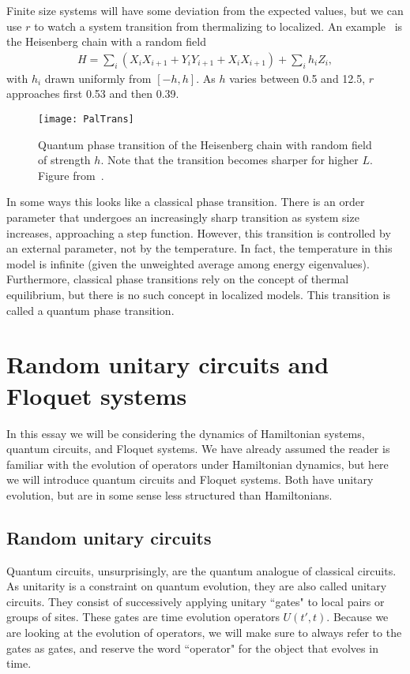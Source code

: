 \documentclass[a4paper,11pt]{article}
\begin{document}
Finite size systems will have some deviation from the expected values, but we can use $r$ to watch a system transition from thermalizing to localized. An example~\cite{PalHuse} is the Heisenberg chain with a random field
\begin{align}
H = \sum_i\left(X_iX_{i+1} + Y_iY_{i+1} + X_iX_{i+1}\right)+\sum_i h_iZ_i,
\end{align}
with $h_i$ drawn uniformly from $[-h,h]$. As $h$ varies between 0.5 and 12.5, $r$ approaches first 0.53 and then 0.39. 
\begin{figure}
	\centering
	\texttt{[image: PalTrans]}
	\caption{Quantum phase transition of the Heisenberg chain with random field of strength $h$. Note that the transition becomes sharper for higher $L$. Figure from~\cite{PalHuse}.}
	\label{fig:PalTrans}
\end{figure}
In some ways this looks like a classical phase transition. There is an order parameter that undergoes an increasingly sharp transition as system size increases, approaching a step function. However, this transition is controlled by an external parameter, not by the temperature. In fact, the temperature in this model is infinite (given the unweighted average among energy eigenvalues). Furthermore, classical phase transitions rely on the concept of thermal equilibrium, but there is no such concept in localized models. This transition is called a quantum phase transition.


\section{Random unitary circuits and Floquet systems} \label{sec:circuits}

In this essay we will be considering the dynamics of Hamiltonian systems, quantum circuits, and Floquet systems. We have already assumed the reader is familiar with the evolution of operators under Hamiltonian dynamics, but here we will introduce quantum circuits and Floquet systems. Both have unitary evolution, but are in some sense less structured than Hamiltonians.

\subsection{Random unitary circuits} \label{sub:ruc}

Quantum circuits, unsurprisingly, are the quantum analogue of classical circuits. As unitarity is a constraint on quantum evolution, they are also called unitary circuits. They consist of successively applying unitary ``gates" to local pairs or groups of sites. These gates are time evolution operators $U(t',t)$. Because we are looking at the evolution of operators, we will make sure to always refer to the gates as gates, and reserve the word ``operator" for the object that evolves in time.
\end{document}
